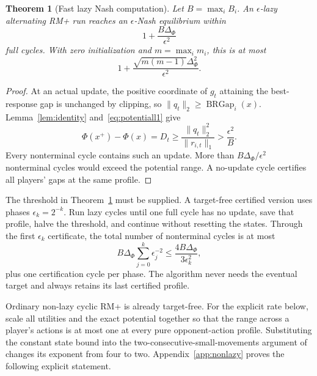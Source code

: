 \documentclass{article}
\newtheorem{theorem}{Theorem}
\newcommand{\BRGap}{\operatorname{BRGap}}
\begin{document}
\begin{theorem}[Fast lazy Nash computation]
\label{thm:lazy}
Let $B=\max_iB_i$. An $\epsilon$-lazy alternating RM+ run reaches an $\epsilon$-Nash equilibrium within
\begin{equation}
1+\frac{B\Delta_\Phi}{\epsilon^2}
\label{eq:lazybound}
\end{equation}
full cycles. With zero initialization and $m=\max_im_i$, this is at most
\begin{equation}
1+\frac{\sqrt{m(m-1)}\Delta_\Phi^2}{\epsilon^2}.
\label{eq:lazyzero}
\end{equation}
\end{theorem}

\begin{proof}
At an actual update, the positive coordinate of $g_t$ attaining the best-response gap is unchanged by clipping, so $\|q_t\|_2\ge\BRGap_i(x)$. Lemma~\ref{lem:identity} and~\eqref{eq:potentiall1} give
\begin{equation}
\Phi(x^+)-\Phi(x)=D_t\ge\frac{\|q_t\|_2^2}{\|r_{i,t}\|_1}
>\frac{\epsilon^2}{B}.
\end{equation}
Every nonterminal cycle contains such an update. More than $B\Delta_\Phi/\epsilon^2$ nonterminal cycles would exceed the potential range. A no-update cycle certifies all players' gaps at the same profile.
\end{proof}

The threshold in Theorem~\ref{thm:lazy} must be supplied. A target-free certified version uses phases $\epsilon_k=2^{-k}$. Run lazy cycles until one full cycle has no update, save that profile, halve the threshold, and continue without resetting the states. Through the first $\epsilon_k$ certificate, the total number of nonterminal cycles is at most
\begin{equation}
B\Delta_\Phi\sum_{j=0}^k\epsilon_j^{-2}
\le\frac{4B\Delta_\Phi}{3\epsilon_k^2},
\label{eq:phased}
\end{equation}
plus one certification cycle per phase. The algorithm never needs the eventual target and always retains its last certified profile.

Ordinary non-lazy cyclic RM+ is already target-free. For the explicit rate below, scale all utilities and the exact potential together so that the range across a player's actions is at most one at every pure opponent-action profile. Substituting the constant state bound into the two-consecutive-small-movements argument of \citet{Anagnostides26:Convergence} changes its exponent from four to two. Appendix~\ref{app:nonlazy} proves the following explicit statement.
\end{document}
